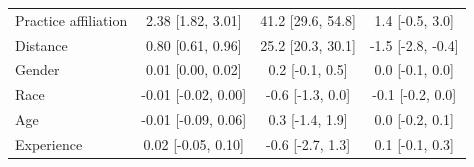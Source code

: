 \begin{tabular}{lccc}
\hspace{1em}Practice affiliation & 2.38 [1.82, 3.01] & 41.2 [29.6, 54.8] & 1.4 [-0.5, 3.0]\\
\hspace{1em}Distance & 0.80 [0.61, 0.96] & 25.2 [20.3, 30.1] & -1.5 [-2.8, -0.4]\\
\hspace{1em}Gender & 0.01 [0.00, 0.02] & 0.2 [-0.1, 0.5] & 0.0 [-0.1, 0.0]\\
\hspace{1em}Race & -0.01 [-0.02, 0.00] & -0.6 [-1.3, 0.0] & -0.1 [-0.2, 0.0]\\
\hspace{1em}Age & -0.01 [-0.09, 0.06] & 0.3 [-1.4, 1.9] & 0.0 [-0.2, 0.1]\\
\hspace{1em}Experience & 0.02 [-0.05, 0.10] & -0.6 [-2.7, 1.3] & 0.1 [-0.1, 0.3]\\
\bottomrule
\end{tabular}
